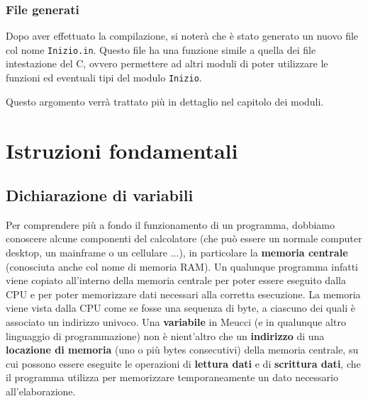 \documentclass[10pt]{book}%
\newcommand{\e}{\`{e} }
\newcommand{\ac}[1]{\`{#1}}
\newcommand{\code}[1]{\texttt{#1}}
\renewcommand{\emph}[1]{\textbf{#1}}
\begin{document}
\subsection*{File generati}
Dopo aver effettuato la compilazione, si noter\ac a che \e stato generato un nuovo file col nome \code{Inizio.in}. Questo file ha una funzione simile a quella dei file intestazione del C, ovvero permettere ad altri moduli di poter utilizzare le funzioni ed eventuali tipi del modulo \code{Inizio}.

Questo argomento verr\ac a trattato pi\ac u in dettaglio nel capitolo dei moduli.

\chapter{Istruzioni fondamentali}
\section{Dichiarazione di variabili}
Per comprendere pi\ac{u} a fondo il funzionamento di un programma, dobbiamo conoscere alcune componenti del calcolatore (che pu\ac o essere un normale computer desktop, un mainframe o un cellulare ...), in particolare la \emph{memoria centrale} (conosciuta anche col nome di memoria RAM). Un qualunque programma infatti viene copiato all'interno della memoria centrale per poter essere eseguito dalla CPU e per poter memorizzare dati necessari alla corretta esecuzione. La memoria viene vista dalla CPU come se fosse una sequenza di byte, a ciascuno dei quali \e associato un indirizzo univoco. Una \emph{variabile} in Meucci (e in qualunque altro linguaggio di programmazione) non \e nient'altro che un \emph{indirizzo} di una \emph{locazione di memoria} (uno o pi\ac u bytes consecutivi) della memoria centrale, su cui possono essere eseguite le operazioni di \emph{lettura dati} e di \emph{scrittura dati}, che il programma utilizza per memorizzare temporaneamente un dato necessario all'elaborazione.
\end{document}
